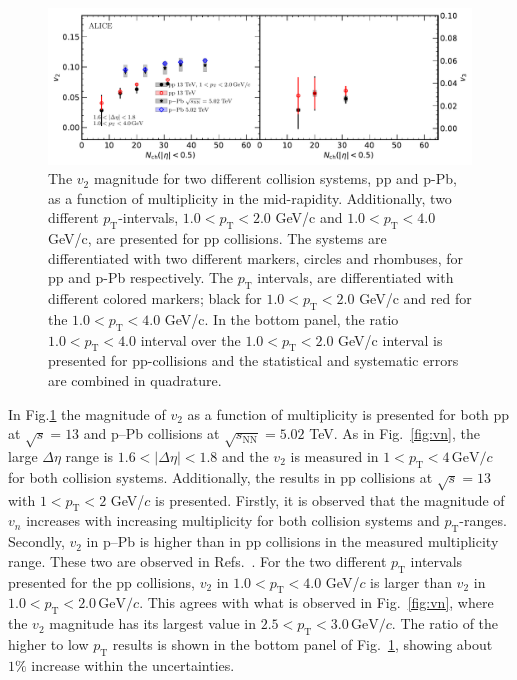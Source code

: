 \begin{figure}[h!]
	\centering
	\includegraphics[width=0.99 \textwidth]{figures/Fig6_vnMult_allSystemsDataOnly.pdf} 
	\caption{The $v_2$ magnitude for two different collision systems, pp and p-Pb, as a function of multiplicity in the mid-rapidity. Additionally, two different $p_\mathrm{T}$-intervals, $1.0<p_\mathrm{T}<2.0$ GeV/c and $1.0<p_\mathrm{T}<4.0$ GeV/c, are presented for pp collisions. The systems are differentiated with two different markers, circles and rhombuses, for pp and p-Pb respectively. The $p_\mathrm{T}$ intervals, are differentiated with different colored markers; black for $1.0<p_\mathrm{T}<2.0$ GeV/c and red for the $1.0<p_\mathrm{T}<4.0$ GeV/c. In the bottom panel, the ratio $1.0<p_\mathrm{T}<4.0$ interval over the $1.0<p_\mathrm{T}<2.0$ GeV/c interval is presented for pp-collisions and the statistical and systematic errors are combined in quadrature.} 
	\label{fig:v2mult}
\end{figure}

In Fig.\ref{fig:v2mult} the magnitude of $v_2$ as a function of multiplicity is presented for both pp at $\sqrt{s}=13$ and p--Pb collisions at $\sqrt{s_\mathrm{NN}}=5.02$ TeV. As in Fig.~\ref{fig:vn}, the large $\Delta\eta$ range is $1.6<|\Delta\eta|<1.8$ and the $v_2$ is measured in $1<p_{\mathrm{T}}<4\,\mathrm{GeV}/c$ for both collision systems. Additionally, the results in pp collisions at $\sqrt{s}=13$ with $1<p_{\mathrm{T}}<2$ GeV/$c$ is presented. Firstly, it is observed that the magnitude of $v_n$ increases with increasing multiplicity for both collision systems and $p_\mathrm{T}$-ranges. Secondly, $v_2$ in p--Pb is higher than in pp collisions in the measured multiplicity range. These two are observed in Refs.~\cite{ATLAS:2015hzw,ATLAS:2016yzd, Khachatryan:2015lva}. 
For the two different $p_\mathrm{T}$ intervals presented for the pp collisions, $v_2$ in $1.0<p_\mathrm{T}<4.0$ GeV/$c$ is larger than $v_2$ in $1.0<p_\mathrm{T}<2.0\,\mathrm{GeV}/c$. This agrees with what is observed in Fig.~\ref{fig:vn}, where the $v_2$ magnitude has its largest value in $2.5<p_\mathrm{T}<3.0\,\mathrm{GeV}/c$. The ratio of the higher to low $p_\mathrm{T}$ results is shown in the bottom panel of Fig.~\ref{fig:v2mult}, showing about $1\%$ increase within the uncertainties.


